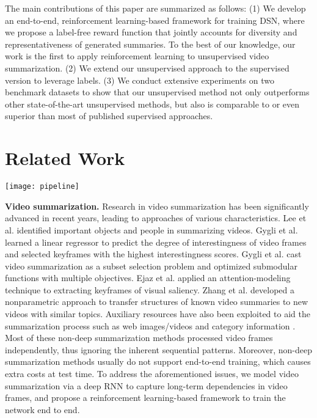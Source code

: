 \documentclass[letterpaper]{article} \usepackage{aaai18}  \usepackage{times}  \usepackage{helvet}  \usepackage{courier}  \usepackage{url}  \usepackage{graphicx}
\begin{document}
The main contributions of this paper are summarized as follows: (1) We develop an end-to-end, reinforcement learning-based framework for training DSN, where we propose a label-free reward function that jointly accounts for diversity and representativeness of generated summaries. To the best of our knowledge, our work is the first to apply reinforcement learning to unsupervised video summarization. (2) We extend our unsupervised approach to the supervised version to leverage labels. (3) We conduct extensive experiments on two benchmark datasets to show that our unsupervised method not only outperforms other state-of-the-art unsupervised methods, but also is comparable to or even superior than most of published supervised approaches.

\section{Related Work}
\begin{figure*}[h]
\centering
\texttt{[image: pipeline]}
\caption{Training deep summarization network (DSN) via reinforcement learning. DSN receives a video  and takes actions  (i.e., a sequence of binary variables) on which parts of the video are selected as the summary . The feedback reward  is computed based on the quality of the summary, i.e., diversity and representativeness.}
\label{fig:pipeline}
\end{figure*}

{\bf Video summarization.}
Research in video summarization has been significantly advanced in recent years, leading to approaches of various characteristics. Lee et al. \cite{lee2012discovering} identified important objects and people in summarizing videos. Gygli et al. \cite{gygli2014creating} learned a linear regressor to predict the degree of interestingness of video frames and selected keyframes with the highest interestingness scores. Gygli et al. \cite{gygli2015video} cast video summarization as a subset selection problem and optimized submodular functions with multiple objectives. Ejaz et al. \cite{ejaz2013efficient} applied an attention-modeling technique to extracting keyframes of visual saliency. Zhang et al. \cite{zhang2016summary} developed a nonparametric approach to transfer structures of known video summaries to new videos with similar topics. Auxiliary resources have also been exploited to aid the summarization process such as web images/videos \cite{song2015tvsum,khosla2013large,chu2015video} and category information \cite{potapov2014category}. Most of these non-deep summarization methods processed video frames independently, thus ignoring the inherent sequential patterns. Moreover, non-deep summarization methods usually do not support end-to-end training, which causes extra costs at test time. To address the aforementioned issues, we model video summarization via a deep RNN to capture long-term dependencies in video frames, and propose a reinforcement learning-based framework to train the network end to end.
\end{document}
